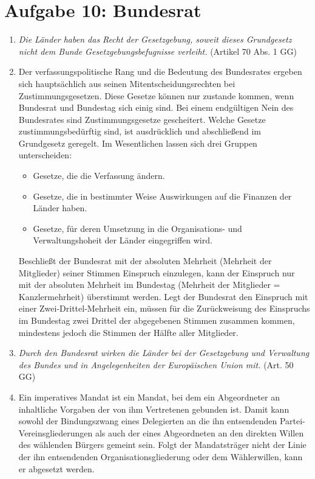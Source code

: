 \documentclass{article}
\begin{document}
	\section*{Aufgabe 10: Bundesrat}
	\begin{enumerate}[label=(\alph*)]
		\item \textit{Die Länder haben das Recht der Gesetzgebung, soweit dieses Grundgesetz nicht dem Bunde Gesetzgebungsbefugnisse verleiht.} (Artikel 70 Abs. 1 GG)
		\item Der verfassungspolitische Rang und die Bedeutung des Bundesrates ergeben sich hauptsächlich aus seinen Mitentscheidungsrechten bei Zustimmungsgesetzen. Diese Gesetze können nur zustande kommen, wenn Bundesrat und Bundestag sich einig sind. Bei einem endgültigen Nein des Bundesrates sind Zustimmungsgesetze gescheitert. Welche Gesetze zustimmungsbedürftig sind, ist ausdrücklich und abschließend im Grundgesetz geregelt. Im Wesentlichen lassen sich drei Gruppen unterscheiden:
		\begin{itemize}
			\item Gesetze, die die Verfassung ändern.
			\item Gesetze, die in bestimmter Weise Auswirkungen auf die Finanzen der Länder haben.
			\item Gesetze, für deren Umsetzung in die Organisations- und Verwaltungshoheit der Länder eingegriffen wird.
		\end{itemize}
		Beschließt der Bundesrat mit der absoluten Mehrheit (Mehrheit der Mitglieder) seiner Stimmen Einspruch einzulegen, kann der Einspruch nur mit der absoluten Mehrheit im Bundestag (Mehrheit der Mitglieder = Kanzlermehrheit) überstimmt werden. Legt der Bundesrat den Einspruch mit einer Zwei-Drittel-Mehrheit ein, müssen für die Zurückweisung des Einspruchs im Bundestag zwei Drittel der abgegebenen Stimmen zusammen kommen, mindestens jedoch die Stimmen der Hälfte aller Mitglieder.
		\item \textit{Durch den Bundesrat wirken die Länder bei der Gesetzgebung und Verwaltung des Bundes und in Angelegenheiten der Europäischen Union mit.} (Art. 50 GG)
		\item Ein imperatives Mandat ist ein Mandat, bei dem ein Abgeordneter an inhaltliche Vorgaben der von ihm Vertretenen gebunden ist. Damit kann sowohl der Bindungszwang eines Delegierten an die ihn entsendenden Partei-Vereinsgliederungen als auch der eines Abgeordneten an den direkten Willen des wählenden Bürgers gemeint sein. Folgt der Mandatsträger nicht der Linie der ihn entsendenden Organisationsgliederung oder dem Wählerwillen, kann er abgesetzt werden.

\end{enumerate}
\end{document}
